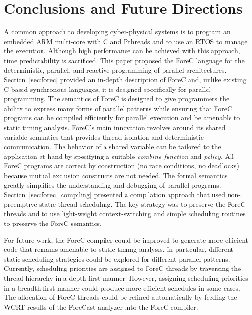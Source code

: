\section{Conclusions and Future Directions}
\label{sec:conclusion}
A common approach to developing cyber-physical systems 
is to program an embedded ARM
multi-core with C and Pthreads and to use an RTOS
to manage the execution. Although high performance 
can be achieved with this approach, time predictability
is sacrificed. This paper proposed the ForeC language for 
the deterministic, parallel, and reactive 
programming of parallel architectures. Section~\ref{sec:forec}
provided an in-depth description of ForeC and, unlike existing 
C-based synchronous languages, it is designed specifically for 
parallel programming. The semantics of ForeC is designed to give 
programmers the ability to express many forms of parallel patterns
while ensuring that ForeC programs can be compiled efficiently
for parallel execution and be amenable to static timing 
analysis. ForeC's main innovation 
revolves around its shared variable semantics that provides 
thread isolation and deterministic communication. The behavior
of a shared variable can be tailored to the application at hand
by specifying a suitable \emph{combine function} and \emph{policy}. All 
ForeC programs are correct by construction (no race conditions,
no deadlocks) 
because mutual exclusion constructs are not needed. The formal 
semantics greatly simplifies the understanding and debugging
of parallel programs.
Section~\ref{sec:forec_compiling} presented a compilation approach
that used non-preemptive static thread scheduling. The key 
strategy was to preserve the ForeC threads and to use light-weight
context-switching and simple scheduling routines to preserve the
ForeC semantics.

For future work, the ForeC compiler could be improved to generate more efficient
code that remains amenable to static timing analysis. In
particular, different static scheduling strategies could be
explored for different parallel patterns. Currently, scheduling 
priorities are assigned to ForeC threads by traversing the thread
hierarchy in a depth-first manner. However, assigning 
scheduling priorities in a breadth-first manner could produce 
more efficient schedules in some cases. The allocation of 
ForeC threads could be refined automatically by feeding the 
WCRT results of the ForeCast analyzer into the ForeC compiler.
